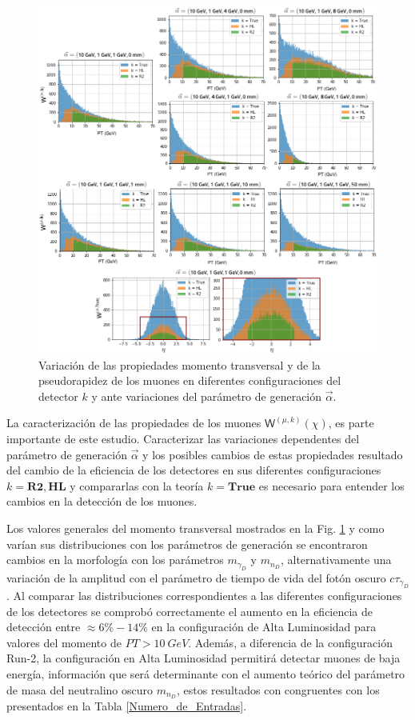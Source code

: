 \begin{figure}[!t]
\centering
\includegraphics[width=.9\textwidth]{Simulacion/imagenes/PT_comparacion.png}
\caption{Variación de las propiedades momento transversal y de la pseudorapidez de los muones en diferentes configuraciones del detector $k$ y ante variaciones del parámetro de generación $\vec{\alpha}$.}
\label{Comparacion}
\end{figure}

La caracterización de las propiedades de los muones $ \textsf{W}^{(\mu,k)} (\chi)$, es parte importante de este estudio. Caracterizar las variaciones dependentes del parámetro de generación $\vec{\alpha}$ y los posibles cambios de estas propiedades resultado del cambio de la eficiencia de los detectores en sus diferentes configuraciones $k=\mathbf{R2}, \mathbf{HL}$ y compararlas con la teoría $k=\mathbf{True}$ es necesario para entender los cambios en la detección de los muones. 

Los valores generales del momento transversal mostrados en la Fig. \ref{Comparacion} y como varían sus distribuciones con los parámetros de generación se encontraron cambios en la morfología con los parámetros $m_{\gamma_D}$ y $m_{n_D}$, alternativamente una variación de la amplitud con el parámetro de tiempo de vida del fotón oscuro $c\tau_{\gamma_D}$. Al comparar las distribuciones correspondientes a las diferentes configuraciones de los detectores se comprobó correctamente el aumento en la eficiencia de detección entre $\approx 6\%-14\%$ en la configuración de Alta Luminosidad para valores del momento de $PT>10 ~GeV$. Además, a diferencia de la configuración Run-2, la configuración en Alta Luminosidad permitirá detectar muones de baja energía, información que será determinante con el aumento teórico del parámetro de masa del neutralino oscuro $m_{n_D}$, estos resultados con congruentes con los presentados en la Tabla \ref{Numero_de_Entradas}.

